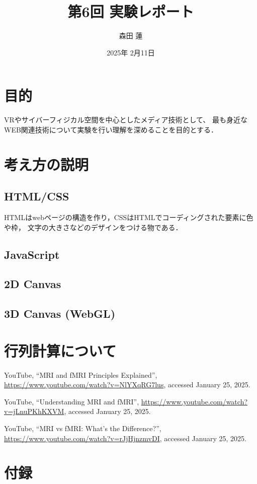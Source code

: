 \documentclass{jlreq}
\title{第6回 実験レポート}
\author{森田 蓮}
\date{2025年 2月11日}
\begin{document}
\maketitle

\section{目的}
VRやサイバーフィジカル空間を中心としたメディア技術として、
最も身近なWEB関連技術について実験を行い理解を深めることを目的とする．

\section{考え方の説明}
\subsection{HTML/CSS}
HTMLはwebページの構造を作り，CSSはHTMLでコーディングされた要素に色や枠，
文字の大きさなどのデザインをつける物である．


\subsection{JavaScript}

\subsection{2D Canvas}

\subsection{3D Canvas (WebGL)}



\section{行列計算について}



\begin{thebibliography}{9}

YouTube, ``MRI and fMRI Principles Explained'', \url{https://www.youtube.com/watch?v=NlYXqRG7lus}, accessed January 25, 2025.

YouTube, ``Understanding MRI and fMRI'', \url{https://www.youtube.com/watch?v=jLnuPKhKXVM}, accessed January 25, 2025.

YouTube, ``MRI vs fMRI: What's the Difference?'', \url{https://www.youtube.com/watch?v=rJjHjnzmvDI}, accessed January 25, 2025.

\end{thebibliography}

\section*{付録}
\end{document}
